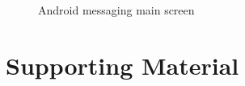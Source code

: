	\begin{figure}[tbh]
	\begin{center}
	\end{center}
	\caption{Android messaging main screen \label{AndroidMessagingMain}}
	\end{figure}


\section{Supporting Material}



